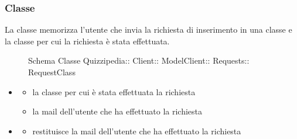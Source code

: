 \subsubsection{Classe }
La classe memorizza l'utente che invia la richiesta di inserimento in una classe e la classe per cui la richiesta è stata effettuata.
\begin{figure}[H]
\centering
\noindent{}
\caption[Schema Classe RequestClass]{Schema Classe Quizzipedia:: Client:: ModelClient:: Requests:: RequestClass}
\end{figure}
\begin{itemize}
\item {}
\begin{itemize}
\item {}
\newline
la classe per cui è stata effettuata la richiesta
\item {}
\newline
la mail dell'utente che ha effettuato la richiesta
\end{itemize}
\item {}
\begin{itemize}
\item {}
\newline
restituisce la mail dell'utente che ha effettuato la richiesta
\newline
\end{itemize}
\end{itemize}
